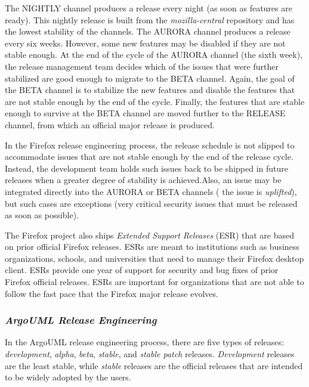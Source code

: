 The NIGHTLY channel produces a release every night (\ie as soon as features are
ready). This nightly release is built from the {\em mozilla-central} repository and has
the lowest stability of the
channels.
The AURORA channel produces a release every six weeks. However, some new
features may be disabled if they are not stable enough. At the end of the cycle
of the AURORA channel (the sixth week), the release management team decides which
of the issues that were further stabilized are good enough to migrate to the BETA
channel. Again, the goal of the BETA channel is to stabilize the new features
and disable the features that are not stable enough by the end of the cycle.
Finally, the features that are stable enough to survive at the BETA channel are
moved further to the RELEASE channel, from which an official major release is
produced.\footnotemark[18]

In the Firefox release engineering process, the release schedule is not slipped
to accommodate issues that are not stable enough by the end of the release
cycle. Instead, the development team holds such issues back to be shipped in
future releases when a greater degree of stability is achieved.\footnotemark[18]
Also, an issue may be integrated directly into the AURORA or BETA channels (\ie
the issue is {\em uplifted}), but such cases are exceptions (\eg very critical
security issues that must be released as soon as possible).\footnotemark[18] 

The Firefox project also ships {\em Extended Support Releases} (ESR) that are
based on prior official Firefox releases. ESRs are meant to institutions such as
business organizations, schools, and universities that need to manage their
Firefox desktop client. ESRs provide one year of support for security and bug
fixes of prior Firefox official releases. ESRs are important for organizations
that are not able to follow the fast pace that the Firefox major release
evolves.

\subsubsection*{\textbf{\textit{ArgoUML Release Engineering}}}\label{argouml:releng}

In the ArgoUML release engineering process, there are five types of releases:
{\em development}, {\em alpha}, {\em beta}, {\em stable}, and {\em stable patch}
releases. {\em Development} releases are the least stable, while {\em stable}
releases are the official releases that are intended to be widely adopted by the
users.
 
